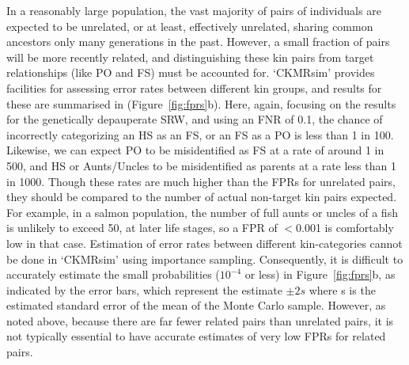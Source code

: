 In a reasonably large population, the vast majority of pairs of individuals are expected to
be unrelated, or at least, effectively unrelated, sharing common ancestors only many generations
in the past.  However, a small fraction of pairs will be more recently related, and distinguishing these
kin pairs from target relationships (like PO and FS) must be accounted for.  `CKMRsim' provides
facilities for assessing error rates between different kin groups, and results for these are
summarised in (Figure~\ref{fig:fprs}b). Here, again, focusing on the results for the genetically
depauperate SRW, and using an FNR of 0.1, the chance of incorrectly
categorizing an HS as an FS,  or an FS as a PO is less than 1 in 100. Likewise, 
we can expect PO to be misidentified as FS at a rate of around 1 in 500, and 
HS or Aunts/Uncles to be misidentified as parents at a rate less than 1 in 1000.
Though these rates are much higher than the FPRs for unrelated pairs, they should be
compared to the number of actual non-target kin pairs expected.  For example, in a salmon
population, the number of full aunts or uncles of a fish is unlikely to exceed 50, 
at later life stages,  so a FPR of  $<$0.001 is comfortably low in that case.
Estimation of
error rates between different kin-categories cannot be done in `CKMRsim' using
importance sampling. Consequently, it is difficult to accurately estimate the small
probabilities ($10^{-4}$ or less) in Figure~\ref{fig:fprs}b, as indicated by the error bars,
which represent the estimate $\pm2s$ where s is the estimated standard error of the
mean of the Monte Carlo sample.  However, as noted above, because there are
far fewer related pairs than unrelated pairs, it is not typically essential to
have accurate estimates of very low FPRs for related pairs.  



